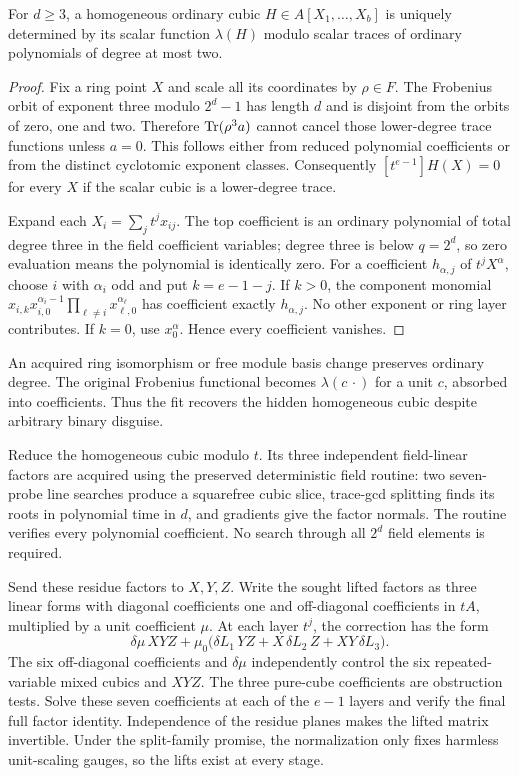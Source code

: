 \documentclass[11pt]{article}
\theoremstyle{remark}\newtheorem{remark}[theorem]{Remark}
\begin{document}
\begin{lemma}
For $d\ge3$, a homogeneous ordinary cubic $H\in A[X_1,\ldots,X_b]$ is
uniquely determined by its scalar function $\lambda(H)$ modulo scalar
traces of ordinary polynomials of degree at most two.
\end{lemma}
\begin{proof}
Fix a ring point $X$ and scale all its coordinates by $\rho\in F$.
The Frobenius orbit of exponent three modulo $2^d-1$ has length $d$
and is disjoint from the orbits of zero, one and two. Therefore
$\operatorname{Tr}(\rho^3 a)$ cannot cancel those lower-degree trace functions unless
$a=0$. This follows either from reduced polynomial coefficients or from
the distinct cyclotomic exponent classes. Consequently
$[t^{e-1}]H(X)=0$ for every $X$ if the scalar cubic is a lower-degree trace.

Expand each $X_i=\sum_j t^j x_{ij}$. The top coefficient is an ordinary
polynomial of total degree three in the field coefficient variables;
degree three is below $q=2^d$, so zero evaluation means the polynomial is
identically zero. For a coefficient $h_{\alpha,j}$ of $t^jX^\alpha$,
choose $i$ with $\alpha_i$ odd and put $k=e-1-j$. If $k>0$, the component
monomial
$x_{i,k}x_{i,0}^{\alpha_i-1}\prod_{\ell\ne i}x_{\ell,0}^{\alpha_\ell}$
has coefficient exactly $h_{\alpha,j}$. No other exponent or ring layer
contributes. If $k=0$, use $x_0^\alpha$. Hence every coefficient vanishes.
\end{proof}

An acquired ring isomorphism or free module basis change preserves ordinary
degree. The original Frobenius functional becomes $\lambda(c\,\cdot)$ for
a unit $c$, absorbed into coefficients. Thus the fit recovers the hidden
homogeneous cubic despite arbitrary binary disguise.

Reduce the homogeneous cubic modulo $t$. Its three independent field-linear
factors are acquired using the preserved deterministic field routine:
two seven-probe line searches produce a squarefree cubic slice, trace-gcd
splitting finds its roots in polynomial time in $d$, and gradients give
the factor normals. The routine verifies every polynomial coefficient.
No search through all $2^d$ field elements is required.

Send these residue factors to $X,Y,Z$. Write the sought lifted factors as
three linear forms with diagonal coefficients one and off-diagonal
coefficients in $tA$, multiplied by a unit coefficient $\mu$.
At each layer $t^j$, the correction has the form
\[
 \delta\mu\,XYZ+\mu_0\bigl(\delta L_1\,YZ+
              X\,\delta L_2\,Z+XY\,\delta L_3\bigr).
\]
The six off-diagonal coefficients and $\delta\mu$ independently control the
six repeated-variable mixed cubics and $XYZ$. The three pure-cube
coefficients are obstruction tests. Solve these seven coefficients at each
of the $e-1$ layers and verify the final full factor identity.
Independence of the residue planes makes the lifted matrix invertible.
Under the split-family promise, the normalization only fixes harmless
unit-scaling gauges, so the lifts exist at every stage.
\end{document}
